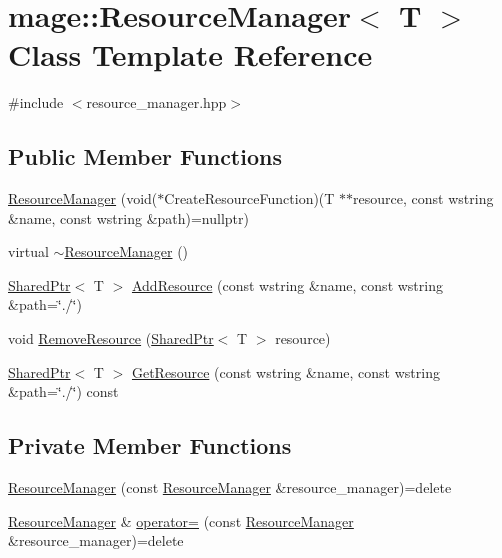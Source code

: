 \hypertarget{classmage_1_1_resource_manager}{}\section{mage\+:\+:Resource\+Manager$<$ T $>$ Class Template Reference}
\label{classmage_1_1_resource_manager}


{\ttfamily \#include $<$resource\+\_\+manager.\+hpp$>$}

\subsection*{Public Member Functions}
\begin{DoxyCompactItemize}
\item 
\hyperlink{classmage_1_1_resource_manager_ab8596e3f3c9fa2eb693cf4cc9aeb95d9}{Resource\+Manager} (void($\ast$Create\+Resource\+Function)(T $\ast$$\ast$resource, const wstring \&name, const wstring \&path)=nullptr)
\item 
virtual \hyperlink{classmage_1_1_resource_manager_af3b6bf56e57bd3df0eb569510dd1483b}{$\sim$\+Resource\+Manager} ()
\item 
\hyperlink{namespacemage_a1e01ae66713838a7a67d30e44c67703e}{Shared\+Ptr}$<$ T $>$ \hyperlink{classmage_1_1_resource_manager_a97e20a40abfebc7709ddd51d78f991b9}{Add\+Resource} (const wstring \&name, const wstring \&path=\char`\"{}./\char`\"{})
\item 
void \hyperlink{classmage_1_1_resource_manager_ac557e5047590d0403291557c88966574}{Remove\+Resource} (\hyperlink{namespacemage_a1e01ae66713838a7a67d30e44c67703e}{Shared\+Ptr}$<$ T $>$ resource)
\item 
\hyperlink{namespacemage_a1e01ae66713838a7a67d30e44c67703e}{Shared\+Ptr}$<$ T $>$ \hyperlink{classmage_1_1_resource_manager_a7632144a5d65ba34b9d1923b9201f129}{Get\+Resource} (const wstring \&name, const wstring \&path=\char`\"{}./\char`\"{}) const
\end{DoxyCompactItemize}
\subsection*{Private Member Functions}
\begin{DoxyCompactItemize}
\item 
\hyperlink{classmage_1_1_resource_manager_a3b424e1ef7f543a2705d1124018d9921}{Resource\+Manager} (const \hyperlink{classmage_1_1_resource_manager}{Resource\+Manager} \&resource\+\_\+manager)=delete
\item 
\hyperlink{classmage_1_1_resource_manager}{Resource\+Manager} \& \hyperlink{classmage_1_1_resource_manager_a5cc1867dbb196671fb53763c98aee1dd}{operator=} (const \hyperlink{classmage_1_1_resource_manager}{Resource\+Manager} \&resource\+\_\+manager)=delete
\end{DoxyCompactItemize}
